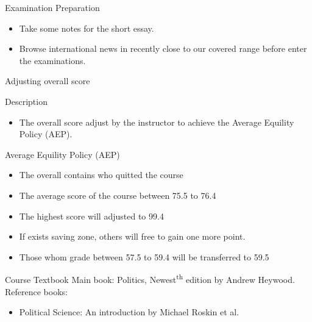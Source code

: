 \documentclass{beamer}
\begin{document}
\begin{frame}{Examination Preparation}
\begin{itemize}
\item Take some notes for the short essay.
\item Browse international news in recently close to our covered range before enter the examinations.
\end{itemize}
\end{frame}
\begin{frame}{Adjusting overall score}
\begin{block}{Description}
\begin{itemize}
\item The overall score adjust by the instructor to achieve the Average Equility Policy (AEP).
\end{itemize}
\end{block}
\begin{block}{Average Equility Policy (AEP)}
\begin{itemize}
\item The overall contains who quitted the course
\item The average score of the course between 75.5 to 76.4
\item The highest score will adjusted to 99.4
\item If exists saving zone, others will free to gain one more point.
\item Those whom grade between 57.5 to 59.4 will be transferred to 59.5
\end{itemize}
\end{block}
\end{frame}
\begin{frame}{Course Textbook}
Main book: Politics, Newest\textsuperscript{th} edition by Andrew Heywood. \\
Reference books:
\begin{itemize}
\item Political Science: An introduction by Michael Roskin et al.
\end{itemize}
\end{frame}
\end{document}
